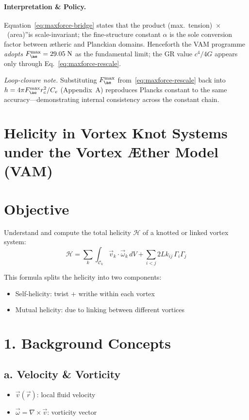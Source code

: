 \paragraph{Interpretation \& Policy.} Equation~\eqref{eq:maxforce-bridge} states that the product \grqq(max.~tension)~$\times$~(area)\textquotedblright is scale-invariant; the fine-structure constant \(\alpha\) is the sole conversion factor between ætheric and Planckian domains.  Henceforth the VAM programme \emph{adopts} \(F_{\ae}^{\max}=29.05\;\mathrm{N}\) as the fundamental limit; the GR value \(c^{4}/4G\) appears only through Eq.~\eqref{eq:maxforce-rescale}.

\smallskip
\noindent\emph{Loop-closure note.}  Substituting \(F_{\ae}^{\max}\) from~\eqref{eq:maxforce-rescale} back into \(h=4\pi F_{\ae}^{\max}r_{c}^{2}/C_{e}\) (Appendix~A) reproduces    Planck\rqs s constant to the same accuracy—demonstrating internal consistency across the constant chain.


\section{Helicity in Vortex Knot Systems under the Vortex \AE{}ther Model (VAM)}\label{sec:calculate-knot-helicity}

\section*{Objective}
Understand and compute the total helicity $\mathcal{H}$ of a knotted or linked vortex system:
\begin{equation}
    \boxed{
        \mathcal{H} = \sum_{k} \int_{\mathcal{C}_k} \vec{v}_k \cdot \vec{\omega}_k \, dV + \sum_{i<j} 2Lk_{ij} \, \Gamma_i \Gamma_j
    }
\end{equation}

This formula splits the helicity into two components:
\begin{itemize}
    \item Self-helicity: twist + writhe within each vortex
    \item Mutual helicity: due to linking between different vortices
\end{itemize}

\section*{1. Background Concepts}
\subsection*{a. Velocity \& Vorticity}
\begin{itemize}
    \item $\vec{v}(\vec{r})$: local fluid velocity
    \item $\vec{\omega} = \nabla \times \vec{v}$: vorticity vector
\end{itemize}

